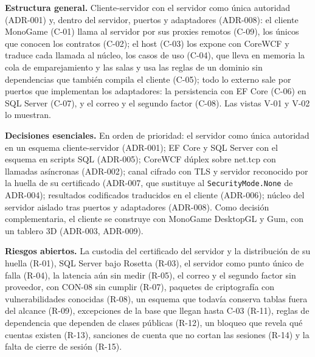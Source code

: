\documentclass[11pt,letterpaper]{article}
\begin{document}
\textbf{Estructura general.} Cliente-servidor con el servidor como única autoridad (ADR-001) y, dentro del servidor, puertos y adaptadores (ADR-008): el cliente MonoGame (C-01) llama al servidor por sus proxies remotos (C-09), los únicos que conocen los contratos (C-02); el host (C-03) los expone con CoreWCF y traduce cada llamada al núcleo, los casos de uso (C-04), que lleva en memoria la cola de emparejamiento y las salas y usa las reglas de un dominio sin dependencias que también compila el cliente (C-05); todo lo externo sale por puertos que implementan los adaptadores: la persistencia con EF Core (C-06) en SQL Server (C-07), y el correo y el segundo factor (C-08). Las vistas V-01 y V-02 lo muestran.

\textbf{Decisiones esenciales.} En orden de prioridad: el servidor como única autoridad en un esquema cliente-servidor (ADR-001); EF Core y SQL Server con el esquema en scripts SQL (ADR-005); CoreWCF dúplex sobre net.tcp con llamadas asíncronas (ADR-002); canal cifrado con TLS y servidor reconocido por la huella de su certificado (ADR-007, que sustituye al \texttt{SecurityMode.None} de ADR-004); resultados codificados traducidos en el cliente (ADR-006); núcleo del servidor aislado tras puertos y adaptadores (ADR-008). Como decisión complementaria, el cliente se construye con MonoGame DesktopGL y Gum, con un tablero 3D (ADR-003, ADR-009).

\textbf{Riesgos abiertos.} La custodia del certificado del servidor y la distribución de su huella (R-01), SQL Server bajo Rosetta (R-03), el servidor como punto único de falla (R-04), la latencia aún sin medir (R-05), el correo y el segundo factor sin proveedor, con CON-08 sin cumplir (R-07), paquetes de criptografía con vulnerabilidades conocidas (R-08), un esquema que todavía conserva tablas fuera del alcance (R-09), excepciones de la base que llegan hasta C-03 (R-11), reglas de dependencia que dependen de clases públicas (R-12), un bloqueo que revela qué cuentas existen (R-13), sanciones de cuenta que no cortan las sesiones (R-14) y la falta de cierre de sesión (R-15).
\end{document}
